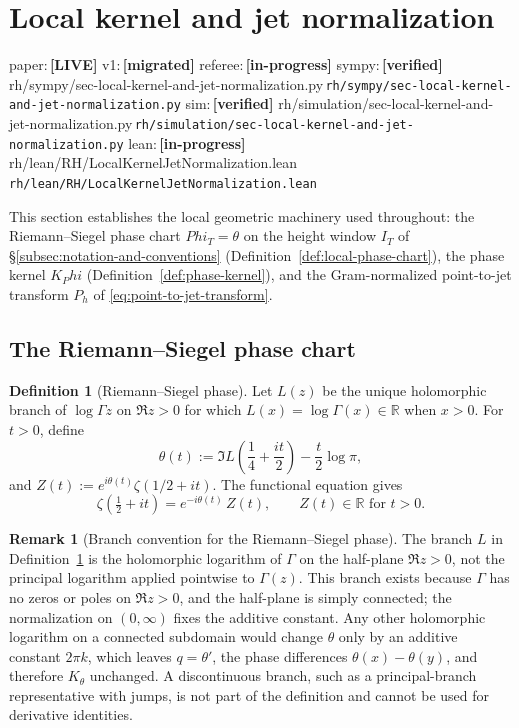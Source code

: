 \documentclass[11pt,a4paper]{amsart}
\def\Phi{Phi}%
\numberwithin{equation}{section}
\theoremstyle{plain}
\theoremstyle{definition}
\newtheorem{definition}[theorem]{Definition}
\newtheorem{remark}[theorem]{Remark}
\newcommand{\Ph}{\Phi}
\newcommand{\status}[1]{\textbf{\scriptsize[#1]}}
\newcommand{\statuspaper}[1]{\textsf{\footnotesize paper:}\,\status{#1}}
\newcommand{\statusmig}[1]{\textsf{\footnotesize v1:}\,\status{#1}}
\newcommand{\statusreferee}[1]{\textsf{\footnotesize referee:}\,\status{#1}}
\newcommand{\statussympy}[2][\relax]{%
  \textsf{\footnotesize sympy:}\,\status{#2}%
  \ifx\relax#1\else\,\textsf{\scriptsize\texttt{#1}}\fi%
}
\newcommand{\statussim}[2][\relax]{%
  \textsf{\footnotesize sim:}\,\status{#2}%
  \ifx\relax#1\else\,\textsf{\scriptsize\texttt{#1}}\fi%
}
\newcommand{\statuslean}[2][\relax]{%
  \textsf{\footnotesize lean:}\,\status{#2}%
  \ifx\relax#1\else\,\textsf{\scriptsize\texttt{#1}}\fi%
}
\begin{document}
\section{Local kernel and jet normalization}
\label{sec:local-kernel-and-jet-normalization}
\statuspaper{LIVE}\quad
\statusmig{migrated}\quad
\statusreferee{in-progress}\quad
\statussympy[rh/sympy/sec-local-kernel-and-jet-normalization.py]{verified}\quad
\statussim[rh/simulation/sec-local-kernel-and-jet-normalization.py]{verified}\quad
\statuslean[rh/lean/RH/LocalKernelJetNormalization.lean]{in-progress}
\par\medskip

This section establishes the local geometric machinery used
throughout: the Riemann--Siegel phase chart \(\Ph_T = \theta\) on the
height window \(I_T\) of
\S\ref{subsec:notation-and-conventions}
(Definition~\ref{def:local-phase-chart}), the phase kernel \(K_\Ph\)
(Definition~\ref{def:phase-kernel}), and the Gram-normalized
point-to-jet transform \(P_h\) of
\eqref{eq:point-to-jet-transform}.

\subsection{The Riemann--Siegel phase chart}
\label{subsec:local-phase-chart}

\begin{definition}[Riemann--Siegel phase]
\label{def:riemann-siegel-phase}
Let \(L(z)\) be the unique holomorphic branch of \(\log\Gamma z\) on
\(\Re z>0\) for which \(L(x)=\log\Gamma(x)\in\mathbb R\) when \(x>0\).
For \(t>0\), define
\begin{equation}
\label{eq:theta-definition}
 \theta(t)
 := \Im L\!\left(\frac14+\frac{it}{2}\right)
    -\frac{t}{2}\log\pi,
\end{equation}
and \(Z(t):=e^{i\theta(t)}\zeta(1/2+it)\).  The functional equation
gives
\[
        \zeta\!\left(\tfrac12+it\right)
        =e^{-i\theta(t)}\,Z(t),
        \qquad Z(t)\in\mathbb R \text{ for } t>0.
\]
\end{definition}

\begin{remark}[Branch convention for the Riemann--Siegel phase]
\label{rem:theta-branch-convention}
The branch \(L\) in Definition~\ref{def:riemann-siegel-phase} is the
holomorphic logarithm of \(\Gamma\) on the half-plane \(\Re z>0\), not the
principal logarithm applied pointwise to \(\Gamma(z)\).  This branch exists
because \(\Gamma\) has no zeros or poles on \(\Re z>0\), and the half-plane
is simply connected; the normalization on \((0,\infty)\) fixes the additive
constant.  Any other holomorphic logarithm on a connected subdomain would
change \(\theta\) only by an additive constant \(2\pi k\), which leaves
\(q=\theta'\), the phase differences \(\theta(x)-\theta(y)\), and therefore
\(K_\theta\) unchanged.  A discontinuous branch, such as a principal-branch
representative with jumps, is not part of the definition and cannot be used
for derivative identities.
\end{remark}
\end{document}
